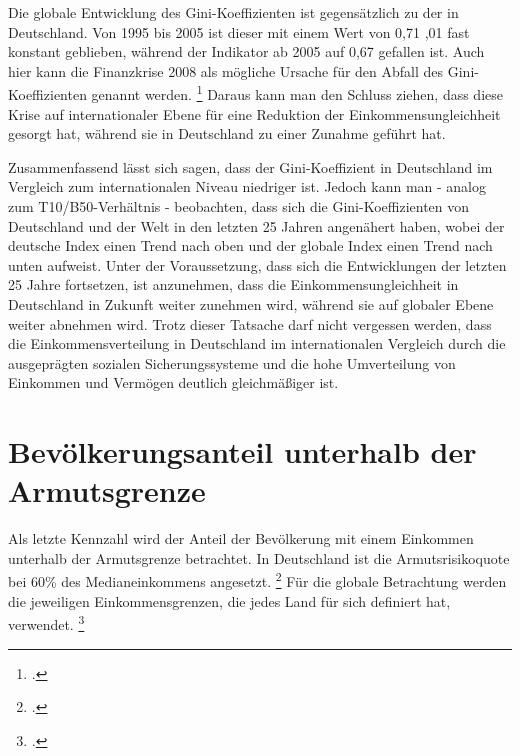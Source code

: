 Die globale Entwicklung des Gini-Koeffizienten ist gegensätzlich zu der in Deutschland. Von 1995 bis 2005 ist dieser mit einem Wert von 0,71 ,01 fast konstant geblieben, während der Indikator ab 2005 auf 0,67 gefallen ist. Auch hier kann die Finanzkrise 2008 als mögliche Ursache für den Abfall des Gini-Koeffizienten genannt werden. \footcite[Vgl. ][S. 55]{wir_2022} Daraus kann man den Schluss ziehen, dass diese Krise auf internationaler Ebene für eine Reduktion der Einkommensungleichheit gesorgt hat, während sie in Deutschland zu einer Zunahme geführt hat.

Zusammenfassend lässt sich sagen, dass der Gini-Koeffizient in Deutschland im Vergleich zum internationalen Niveau niedriger ist. Jedoch kann man - analog zum T10/B50-Verhältnis - beobachten, dass sich die Gini-Koeffizienten von Deutschland und der Welt in den letzten 25 Jahren angenähert haben, wobei der deutsche Index einen Trend nach oben und der globale Index einen Trend nach unten aufweist. Unter der Voraussetzung, dass sich die Entwicklungen der letzten 25 Jahre fortsetzen, ist anzunehmen, dass die Einkommensungleichheit in Deutschland in Zukunft weiter zunehmen wird, während sie auf globaler Ebene weiter abnehmen wird. Trotz dieser Tatsache darf nicht vergessen werden, dass die Einkommensverteilung in Deutschland im internationalen Vergleich durch \zB die ausgeprägten sozialen Sicherungssysteme und die hohe Umverteilung von Einkommen und Vermögen deutlich gleichmä{\ss}iger ist.

\section{Bevölkerungsanteil unterhalb der Armutsgrenze}

Als letzte Kennzahl wird der Anteil der Bevölkerung mit einem Einkommen unterhalb der Armutsgrenze betrachtet. In Deutschland ist die Armutsrisikoquote bei 60\% des Medianeinkommens angesetzt. \footcite[Vgl.][]{bmas_arb_armutsrisikoquote_2023} Für die globale Betrachtung werden die jeweiligen Einkommensgrenzen, die jedes Land für sich definiert hat, verwendet. \footcite[Vgl.][]{wb_armutsquote_global_2022}

